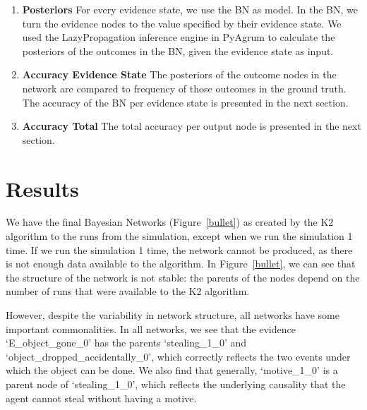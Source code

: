 \documentclass[12pt]{article}
\begin{document}
\begin{enumerate}
\item \textbf{Posteriors} For every evidence state, we use the BN as model. In the BN, we turn the evidence nodes to the value specified by their evidence state. We used the LazyPropagation inference engine in PyAgrum to calculate the posteriors of the outcomes in the BN, given the evidence state as input. 

\item \textbf{Accuracy Evidence State} The posteriors of the outcome nodes in the network are compared to frequency of those outcomes in the ground truth. The accuracy of the BN per evidence state is presented in the next section.
\item \textbf{Accuracy Total} The total accuracy per output node is presented in the next section. 
\end{enumerate}



\section{Results}


We have the final Bayesian Networks (Figure~\ref{bullet}) as created by the K2 algorithm to the runs from the simulation, except when we run the simulation 1 time. If we run the simulation 1 time, the network cannot be produced, as there is not enough data available to the algorithm. In Figure~\ref{bullet}, we can see that the structure of the network is not stable: the parents of the nodes depend on the number of runs that were available to the K2 algorithm.

However, despite the variability in network structure, all networks have some important commonalities. In all networks, we see that the evidence `E\_object\_gone\_0' has the parents `stealing\_1\_0' and `object\_dropped\_accidentally\_0', which correctly reflects the two events under which the object can be done. We also find that generally, `motive\_1\_0' is a parent node of `stealing\_1\_0', which reflects the underlying causality that the agent cannot steal without having a motive.
 
\end{document}
